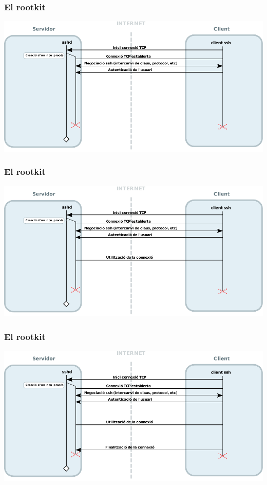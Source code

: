 \documentclass{beamer}
\begin{document}
\begin{frame}
	\frametitle{El rootkit}
	\includegraphics[scale=0.65,keepaspectratio]{sshd_5.pdf}
\end{frame}

\begin{frame}
	\frametitle{El rootkit}
	\includegraphics[scale=0.65,keepaspectratio]{sshd_6.pdf}
\end{frame}

\begin{frame}
	\frametitle{El rootkit}
	\includegraphics[scale=0.65,keepaspectratio]{sshd.pdf}
\end{frame}
\end{document}
